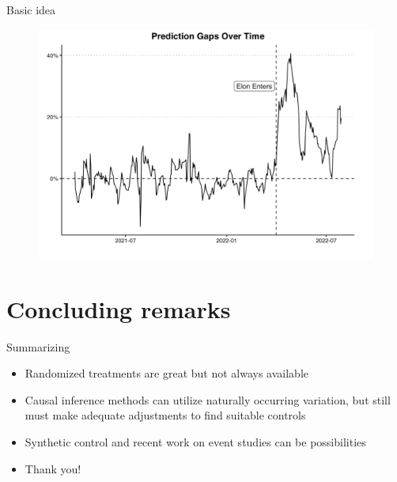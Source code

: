 \documentclass{beamer}
\begin{document}
\begin{frame}{Basic idea}

\begin{figure}
\includegraphics[scale=0.35]{./lecture_includes/baker_gelbach_4}
\end{figure}
\end{frame}

\section{Concluding remarks}

\begin{frame}{Summarizing}

\begin{itemize}
\item Randomized treatments are great but not always available 
\item Causal inference methods can utilize naturally occurring variation, but still must make adequate adjustments to find suitable controls
\item Synthetic control and recent work on event studies can be possibilities
\item Thank you!

\end{itemize}

\end{frame}
\end{document}
